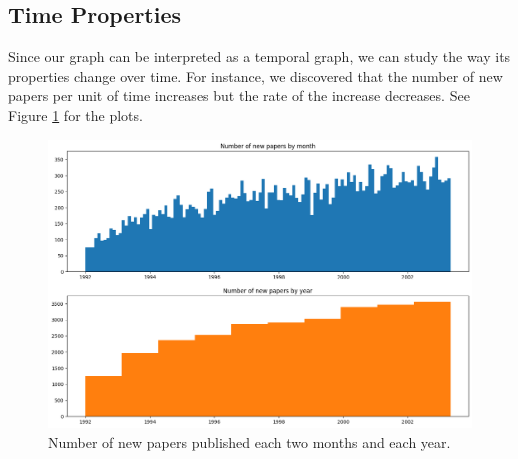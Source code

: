 \subsection{Time Properties}
\tab Since our graph can be interpreted as a temporal graph, we can study the way its properties change over time. For instance, we discovered that the number of new papers per unit of time increases but the rate of the increase decreases. See Figure \ref{plot:number_of_new_papers} for the plots.
\begin{figure}[h]
\centering
\includegraphics[width=0.9\linewidth]{new_papers_over_time.png}
\caption{Number of new papers published each two months and each year.}
\label{plot:number_of_new_papers}
\end{figure}

